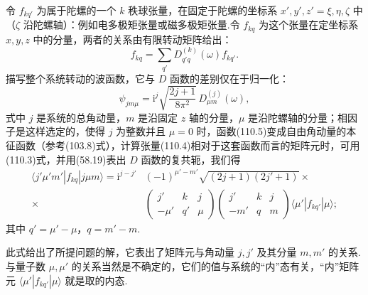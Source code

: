 令 $f_{kq'}$ 为属于陀螺的一个 $k$ 秩球张量，在固定于陀螺的坐标系 $x',y',z'=\xi,\eta,\zeta$ 中（$\zeta$ 沿陀螺轴）：例如电多极矩张量或磁多极矩张量.令 $f_{kq}$ 为这个张量在定坐标系 $x,y,z$ 中的分量，两者的关系由有限转动矩阵给出：
\begin{equation}
  f_{kq}=\sum_{q'}D^{(k)}_{q'q}(\omega)f_{kq'}.
\end{equation}
描写整个系统转动的波函数，它与 $D$ 函数的差别仅在于归一化：
\begin{equation}
  \psi_{jm\mu}=\mathrm{i}^j\sqrt{\frac{2j+1}{8\pi^2}}\,
  D^{(j)}_{\mu m}(\omega),
\end{equation}
式中 $j$ 是系统的总角动量，$m$ 是沿固定 $z$ 轴的分量，$\mu$ 是沿陀螺轴的分量；相因子是这样选定的，使得 $j$ 为整数并且 $\mu=0$ 时，函数(110.5)变成自由角动量的本征函数（参考(103.8)式），计算张量(110.4)相对于这套函数而言的矩阵元时，可用(110.3)式，并用(58.19)表出 $D$ 函数的复共轭，我们得
\begin{equation}
\begin{aligned}
  \langle j'\mu'm'|f_{kq}|j\mu m\rangle
  =\mathrm{i}^{j-j'}&(-1)^{\mu'-m'}\sqrt{(2j+1)(2j'+1)}\times\\
  \times&\left(\begin{array}{ccc}j'&k&j\\-\mu'&q'&\mu\end{array}\right)
  \left(\begin{array}{ccc}j'&k&j\\-m'&q&m\end{array}\right)
  \langle\mu'|f_{kq'}|\mu\rangle;
\end{aligned}
\end{equation}
其中 $q'=\mu'-\mu$，$q=m'-m$.

此式给出了所提问题的解，它表出了矩阵元与角动量 $j,j'$ 及其分量 $m,m'$ 的关系.与量子数 $\mu,\mu'$ 的关系当然是不确定的，它们的值与系统的“内”态有关，“内”矩阵元 $\langle\mu'|f_{kq'}|\mu\rangle$ 就是取的内态.


